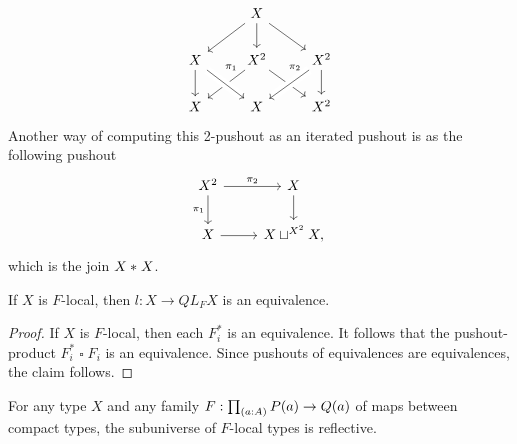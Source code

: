 \begin{eg}
\begin{equation*}
\begin{tikzcd}
& X \arrow[dl] \arrow[d] \arrow[dr] \\
X \arrow[d] & X^2 \arrow[dl,swap,"\pi_1" very near start] \arrow[dr] & X^2 \arrow[dl,crossing over,swap,"\pi_2" very near start] \arrow[d] \\
X & X \arrow[from=ul,crossing over] & X^2
\end{tikzcd}
\end{equation*}
Another way of computing this 2-pushout as an iterated pushout is as the following pushout
\begin{equation*}
\begin{tikzcd}
X^2 \arrow[r,"\pi_2"] \arrow[d,swap,"\pi_1"] & X \arrow[d] \\
X \arrow[r] & X\sqcup^{X^2} X,
\end{tikzcd}
\end{equation*}
which is the join ${X}\ast_{}{X}$.
\end{eg}

\begin{prp}
If $X$ is $F$-local, then $l:X\to QL_F X$ is an equivalence.
\end{prp}

\begin{proof}
If $X$ is $F$-local, then each $F_i^\ast$ is an equivalence. It follows that the pushout-product $F_i^\ast\mathbin{\square} F_i$ is an equivalence. Since pushouts of equivalences are equivalences, the claim follows.
\end{proof}

\begin{thm}
For any type $X$ and any family $F:\prd{a:A}P(a)\to Q(a)$ of maps between
compact types, the subuniverse of $F$-local types is reflective.
\end{thm}

